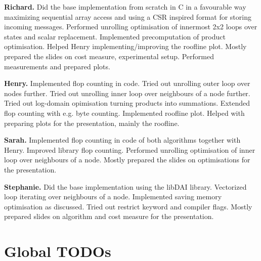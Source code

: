 \documentclass[letterpaper]{article}
\newcommand{\mypar}[1]{{\bf #1.}}
\begin{document}

\mypar{Richard} Did the base implementation from scratch in C in a favourable way maximizing sequential array access and using a CSR inspired format for storing incoming messages. Performed unrolling optimisation of innermost 2x2 loops over states and scalar replacement. Implemented precomputation of product optimisation. Helped Henry implementing/improving the roofline plot. Mostly prepared the slides on cost measure, experimental setup. Performed measurements and prepared plots.

\mypar{Henry} Implemented flop counting in code. Tried out unrolling outer loop over nodes further. Tried out unrolling inner loop over neighbours of a node further. Tried out log-domain opimisation turning products into summations. Extended flop counting with e.g. byte counting. Implemented roofline plot. Helped with preparing plots for the presentation, mainly the roofline.

\mypar{Sarah} Implemented flop counting in code of both algorithms together with Henry. Improved library flop counting. Performed unrolling optimisation of inner loop over neighbours of a node. Mostly prepared the slides on optimisations for the presentation.

\mypar{Stephanie} Did the base implementation using the libDAI library. Vectorized loop iterating over neighbours of a node. Implemented saving memory optimisation as discussed. Tried out restrict keyword and compiler flags. Mostly prepared slides on algorithm and cost measure for the presentation.


\section{Global TODOs}


%


\end{document}
